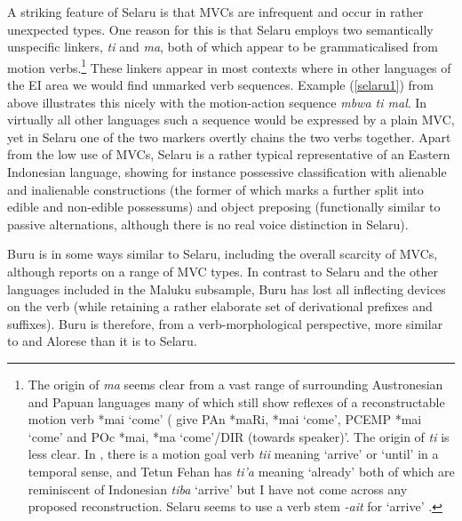 A striking feature of Selaru is that MVCs are infrequent and occur in rather unexpected types. One reason for this is that Selaru employs two semantically unspecific linkers, \textit{ti} and \textit{ma}, both of which appear to be grammaticalised from motion verbs.\footnote{The origin of \textit{ma} seems clear from a vast range of surrounding Austronesian and Papuan languages many of which still show reflexes of a reconstructable motion verb *mai `come' (\citealt{ross2008lexicon} give PAn *maRi, *mai `come', PCEMP *mai `come' and POc *mai, *ma `come'/DIR (towards speaker)'. The origin of \textit{ti} is less clear. In , there is a motion goal verb \textit{tii} meaning `arrive' or `until' in a temporal sense, and Tetun Fehan has \textit{ti'a} meaning `already' both of which are reminiscent of Indonesian \textit{tiba} `arrive' but I have not come across any proposed reconstruction. Selaru seems to use a verb stem \textit{-ait} for `arrive' \citep[175]{coward2005}.} These linkers appear in most contexts where in other languages of the EI area we would find unmarked verb sequences. Example (\ref{selaru1}) from above illustrates this nicely with the motion-action sequence \textit{mbwa ti mal}. In virtually all other languages such a sequence would be expressed by a plain MVC, yet in Selaru one of the two markers overtly chains the two verbs together. Apart from the low use of MVCs, Selaru is a rather typical representative of an Eastern Indonesian language, showing for instance possessive classification with alienable and inalienable constructions (the former of which marks a further split into edible and non-edible possessums) and object preposing (functionally similar to passive alternations, although there is no real voice distinction in Selaru). 

Buru is in some ways similar to Selaru, including the overall scarcity of MVCs, although \citet{grimes1991buru} reports on a range of MVC types. In contrast to Selaru and the other languages included in the Maluku subsample, Buru has lost all inflecting devices on the verb (while retaining a rather elaborate set of derivational prefixes and suffixes). Buru is therefore, from a verb-morphological perspective, more similar to  and Alorese than it is to Selaru.

